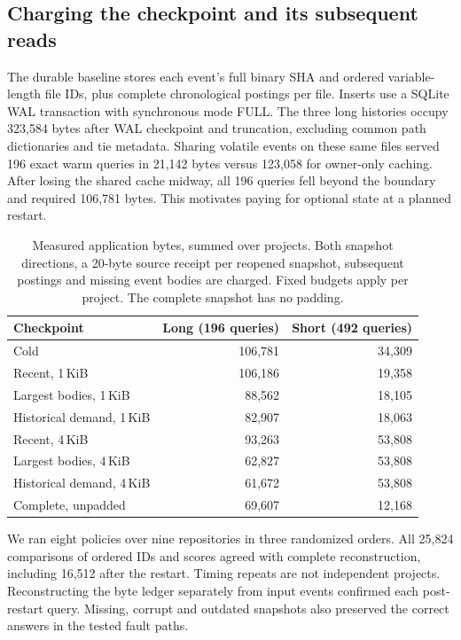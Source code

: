 \documentclass[conference]{IEEEtran}
\begin{document}
\subsection{Charging the checkpoint and its subsequent reads}
The durable baseline stores each event's full binary SHA and ordered variable-length file IDs, plus complete chronological postings per file. Inserts use a SQLite WAL transaction with synchronous mode FULL. The three long histories occupy 323,584 bytes after WAL checkpoint and truncation, excluding common path dictionaries and tie metadata. Sharing volatile events on these same files served 196 exact warm queries in 21,142 bytes versus 123,058 for owner-only caching. After losing the shared cache midway, all 196 queries fell beyond the boundary and required 106,781 bytes. This motivates paying for optional state at a planned restart.

\begin{table}[t]
\caption{Measured application bytes, summed over projects. Both snapshot directions, a 20-byte source receipt per reopened snapshot, subsequent postings and missing event bodies are charged. Fixed budgets apply per project. The complete snapshot has no padding.}
\label{tab:storage}\centering\small
\setlength{\tabcolsep}{3.5pt}
\begin{tabular}{@{}lrr@{}}\toprule
Checkpoint & Long (196 queries) & Short (492 queries) \\\midrule
Cold & 106,781 & 34,309\\
Recent, 1\,KiB & 106,186 & 19,358\\
Largest bodies, 1\,KiB & 88,562 & 18,105\\
Historical demand, 1\,KiB & 82,907 & 18,063\\
Recent, 4\,KiB & 93,263 & 53,808\\
Largest bodies, 4\,KiB & 62,827 & 53,808\\
Historical demand, 4\,KiB & 61,672 & 53,808\\
Complete, unpadded & 69,607 & 12,168\\\bottomrule
\end{tabular}
\end{table}

We ran eight policies over nine repositories in three randomized orders. All 25,824 comparisons of ordered IDs and scores agreed with complete reconstruction, including 16,512 after the restart. Timing repeats are not independent projects. Reconstructing the byte ledger separately from input events confirmed each post-restart query. Missing, corrupt and outdated snapshots also preserved the correct answers in the tested fault paths.
\end{document}
